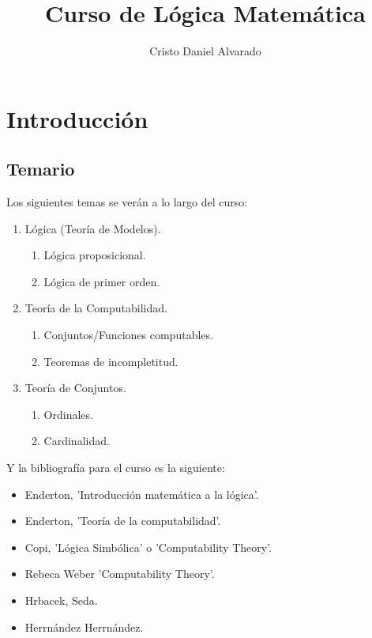 \documentclass[12pt]{report}
\renewcommand{\theenumii}{\roman{enumii}}
\theoremstyle{largebreak}
\begin{document}
    \title{Curso de Lógica Matemática}
    \author{Cristo Daniel Alvarado}
    \maketitle

    \tableofcontents %

    \setcounter{chapter}{-1} %
    
    \chapter{Introducción}
    
    \section{Temario}
    

    Los siguientes temas se verán a lo largo del curso:

    \renewcommand{\theenumii}{\arabic{enumi}.\arabic{enumii}}

    \begin{enumerate}
        \item Lógica (Teoría de Modelos).
        \begin{enumerate}
            \item Lógica proposicional.
            \item Lógica de primer orden.
        \end{enumerate}
        \item Teoría de la Computabilidad.
        \begin{enumerate}
            \item Conjuntos/Funciones computables.
            \item Teoremas de incompletitud.
        \end{enumerate}
        \item Teoría de Conjuntos.
        \begin{enumerate}
            \item Ordinales.
            \item Cardinalidad.
        \end{enumerate}
    \end{enumerate}

    Y la bibliografía para el curso es la siguiente:

    \begin{itemize}
        \item Enderton, 'Introducción matemática a la lógica'.
        \item  Enderton, 'Teoría de la computabilidad'.
        \item Copi, 'Lógica Simbólica' o 'Computability Theory'.
        \item Rebeca Weber 'Computability Theory'.
        \item Hrbacek, Seda.
        \item Herrnández Herrnández.
    \end{itemize}
\end{document}

